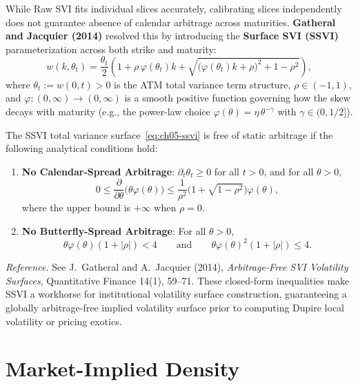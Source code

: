 While Raw SVI fits individual slices accurately, calibrating slices independently does not guarantee absence of calendar arbitrage across maturities. \textbf{Gatheral and Jacquier (2014)} resolved this by introducing the \textbf{Surface SVI (SSVI)} parameterization across both strike and maturity:
\begin{equation}
    \label{eq:ch05-ssvi}
    w(k, \theta_t)
    = \frac{\theta_t}{2}\left(1 + \rho\,\varphi(\theta_t)k + \sqrt{\bigl(\varphi(\theta_t)k + \rho\bigr)^2 + 1 - \rho^2}\right),
\end{equation}
where $\theta_t := w(0, t) > 0$ is the ATM total variance term structure, $\rho \in (-1, 1)$, and $\varphi : (0, \infty) \to (0, \infty)$ is a smooth positive function governing how the skew decays with maturity (e.g., the power-law choice $\varphi(\theta) = \eta\,\theta^{-\gamma}$ with $\gamma \in (0, 1/2]$).

\begin{theorem}
    \label{thm:ch05-ssvi-no-arb}
    The SSVI total variance surface~\eqref{eq:ch05-ssvi} is free of static arbitrage if the following analytical conditions hold:
    \begin{enumerate}
        \item \textbf{No Calendar-Spread Arbitrage}: $\partial_t \theta_t \ge 0$ for all $t > 0$, and for all $\theta > 0$,
        \[
            0 \le \frac{\partial}{\partial \theta}\bigl(\theta\varphi(\theta)\bigr)
            \le \frac{1}{\rho^2}\bigl(1 + \sqrt{1 - \rho^2}\bigr)\varphi(\theta),
        \]
        where the upper bound is $+\infty$ when $\rho = 0$.
        \item \textbf{No Butterfly-Spread Arbitrage}: For all $\theta > 0$,
        \[
            \theta\varphi(\theta)(1 + |\rho|) < 4
            \qquad \text{and} \qquad
            \theta\varphi(\theta)^2(1 + |\rho|) \le 4.
        \]
    \end{enumerate}
\end{theorem}
\noindent\emph{Reference.} See J.~Gatheral and A.~Jacquier (2014), \emph{Arbitrage-Free SVI Volatility Surfaces}, Quantitative Finance 14(1), 59--71. These closed-form inequalities make SSVI a workhorse for institutional volatility surface construction, guaranteeing a globally arbitrage-free implied volatility surface prior to computing Dupire local volatility or pricing exotics.

\section{Market-Implied Density}
\label{sec:ch05-implied-density}

